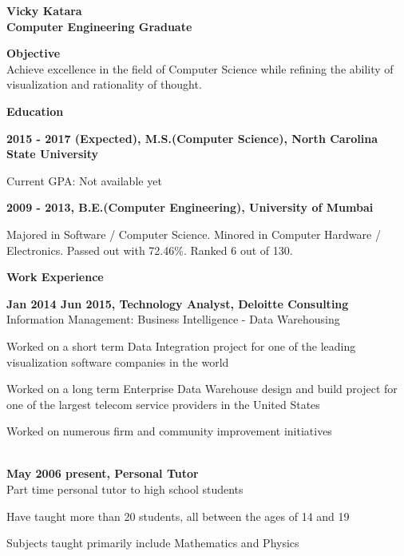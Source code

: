 \documentclass[a4paper,12pt,final]{memoir}
\newcommand{\Sep}{\vspace{1.5em}}
\newcommand{\SmallSep}{\vspace{0.5em}}
\newenvironment{Objective}
	{\ignorespaces\textbf{\color{Plum} Objective}}
	{\Sep\ignorespacesafterend}
\newcommand{\CVSection}[1]
	{\Large\textbf{#1}\par
	\SmallSep\normalsize\normalfont}
\newcommand{\CVItem}[1]
	{\textbf{\color{Plum} #1}}
\begin{document}
\Huge\bfseries {\color{Plum} Vicky Katara} \\
\Large\bfseries  Computer Engineering Graduate \\

\normalsize\normalfont

\begin{Objective}
\\Achieve excellence in the field of Computer Science while refining the ability of visualization and rationality of thought.
\end{Objective}

\CVSection{Education}
\CVItem{2015 - 2017 (Expected), M.S.(Computer Science), North \hyphenchar\font=-1 Carolina State University}\\
\begin{footnotesize}
	Current GPA: Not available yet
\end{footnotesize}
\SmallSep

\CVItem{2009 - 2013, B.E.(Computer Engineering), University of \allowbreak  Mumbai}\\
 \begin{footnotesize}
 	Majored in Software / Computer Science. Minored in Computer Hardware / Electronics. Passed out with 72.46\%. Ranked 6 out of 130.
 \end{footnotesize}
\SmallSep

\CVSection{Work Experience}
\CVItem{Jan 2014 \textendash \space Jun 2015, Technology Analyst, Deloitte Consulting}\\
\SmallSep
Information Management: Business Intelligence - Data Warehousing\\
\begin{minipage}{13cm}
\begin{compactitem}[\color{Plum}$\circ$]
	{\footnotesize
	\item Worked on a short term Data Integration project for one of the leading visualization software companies in the world
	\item Worked on a long term Enterprise Data Warehouse design and build project for one of the largest telecom service providers in the United States
	\item Worked on numerous firm and community improvement initiatives}
\end{compactitem}
\end{minipage}
\SmallSep\\
\CVItem{May 2006 \textendash \space present, Personal Tutor}\\
\SmallSep
Part time personal tutor to high school students\\
\begin{minipage}{13cm}
	\begin{compactitem}[\color{Plum}$\circ$]
		{\footnotesize
			\item Have taught more than 20 students, all between the ages of 14 and 19
			\item Subjects taught primarily include Mathematics and Physics}
	\end{compactitem}
\end{minipage}
\Sep
\end{document}
